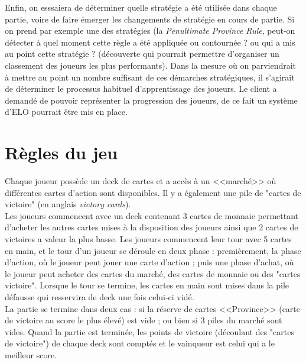 Enfin, on esssaiera de déterminer quelle stratégie a été utilisée dans chaque partie, voire de faire émerger les changements de stratégie en cours de partie. Si on prend par exemple une des stratégies (la \textit{Penultimate Province Rule}, peut-on détecter à quel moment cette règle a été appliquée ou contournée ? ou qui a mis au point cette stratégie ? (découverte qui pourrait permettre d'organiser un classement des joueurs les plus performants). Dans la mesure où on parviendrait à mettre au point un nombre suffisant de ces démarches stratégiques, il s'agirait de déterminer le processus habituel d'apprentissage des joueurs. Le client a demandé de pouvoir représenter la progression des joueurs, de ce fait un système d'ELO\footnotemark\cite{Gli99} pourrait être mis en place.


\section{Règles du jeu}
Chaque joueur possède un deck de cartes et a accès à un <<marché>> où différentes cartes d'action sont disponibles. Il y a également une pile de "cartes de victoire" (en anglais \textit{victory cards}).\\

Les joueurs commencent avec un deck contenant 3 cartes de monnaie permettant d'acheter les autres cartes mises à la disposition des joueurs ainsi que 2 cartes de victoires a valeur la plus basse. Les joueurs commencent leur tour avec 5 cartes en main, et le tour d'un joueur se déroule en deux phase : premièrement, la phase d'action, où le joueur peut jouer une carte d'action ; puis une phase d'achat, où le joueur peut acheter des cartes du marché, des cartes de monnaie ou des "cartes victoire". Lorsque le tour se termine, les cartes en main sont mises dans la pile défausse qui resservira de deck une fois celui-ci vidé.\\

La partie se termine dans deux cas : si la réserve de cartes <<Province>> (carte de victoire au score le plus élevé) est vide ; ou bien si 3 piles du marché sont vides. Quand la partie est terminée, les points de victoire (découlant des "cartes de victoire") de chaque deck sont comptés et le vainqueur est celui qui a le meilleur score.

